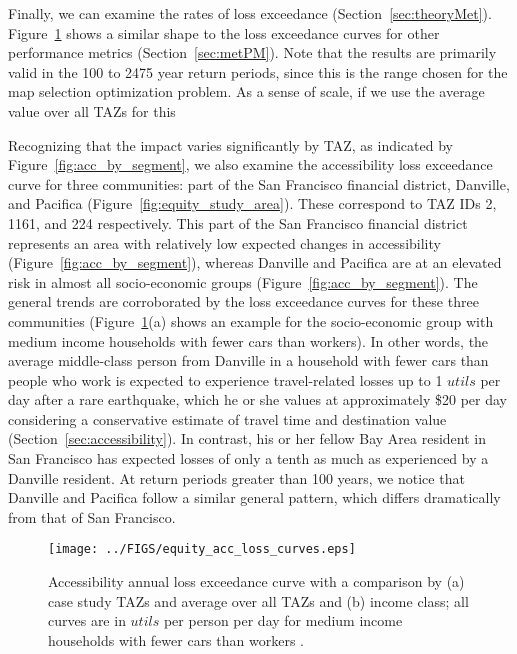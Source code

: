 Finally, we can examine the rates of loss exceedance (Section~\ref{sec:theoryMet}). Figure~\ref{fig:acc_by_TAZ_and_income} shows a similar shape to the loss exceedance curves for other performance metrics (Section~\ref{sec:metPM}). Note that the results are primarily valid in the 100 to 2475 year return periods, since this is the range chosen for the map selection optimization problem. As a sense of scale, if we use the average value over all TAZs for this 

Recognizing that the impact varies significantly by TAZ, as indicated by Figure~\ref{fig:acc_by_segment},
we also examine the accessibility loss exceedance curve for three communities: part of the San Francisco financial district, Danville, and Pacifica (Figure~\ref{fig:equity_study_area}). These correspond to TAZ IDs 2, 1161, and 224 respectively. This part of the San Francisco financial district  represents an area with relatively low expected changes in accessibility (Figure~\ref{fig:acc_by_segment}), whereas Danville and Pacifica are at an elevated risk in almost all socio-economic groups (Figure~\ref{fig:acc_by_segment}). 
The general trends are corroborated by the loss exceedance curves for these three communities (Figure~\ref{fig:acc_by_TAZ_and_income}{(a)} shows an example for the socio-economic group with medium income households with fewer cars than workers). In other words, the average middle-class person from Danville in a household with fewer cars than people who work is expected to experience travel-related losses up to 1 $utils$ per day after a rare earthquake, which he or she values at approximately \$20 per day considering a conservative estimate of travel time and destination value (Section~\ref{sec:accessibility}). In contrast, his or her fellow Bay Area resident in San Francisco has expected losses of only a tenth as much as experienced by a Danville resident. At return periods greater than 100 years, we notice that Danville and Pacifica follow a similar general pattern, which differs dramatically from that of San Francisco. 

\begin{figure}
\centering
\texttt{[image: ../FIGS/equity\_acc\_loss\_curves.eps]} 
\caption{Accessibility annual loss exceedance curve with a comparison by (a) case study TAZs and average over all TAZs and (b) income class; all curves are in $utils$ per person per day for medium income households with fewer cars than workers .}
\label{fig:acc_by_TAZ_and_income}
\end{figure}
